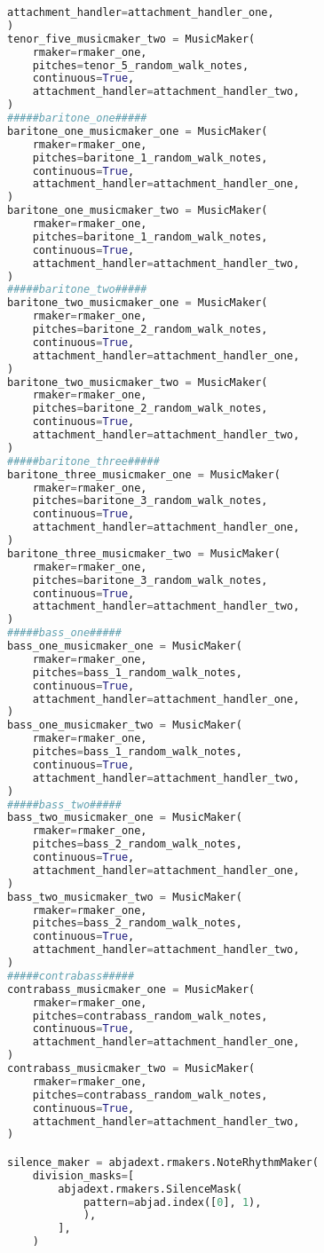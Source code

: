 \begin{lstlisting}[language=Python, caption=Invocation Source Code]
    attachment_handler=attachment_handler_one,
)
tenor_five_musicmaker_two = MusicMaker(
    rmaker=rmaker_one,
    pitches=tenor_5_random_walk_notes,
    continuous=True,
    attachment_handler=attachment_handler_two,
)
#####baritone_one#####
baritone_one_musicmaker_one = MusicMaker(
    rmaker=rmaker_one,
    pitches=baritone_1_random_walk_notes,
    continuous=True,
    attachment_handler=attachment_handler_one,
)
baritone_one_musicmaker_two = MusicMaker(
    rmaker=rmaker_one,
    pitches=baritone_1_random_walk_notes,
    continuous=True,
    attachment_handler=attachment_handler_two,
)
#####baritone_two#####
baritone_two_musicmaker_one = MusicMaker(
    rmaker=rmaker_one,
    pitches=baritone_2_random_walk_notes,
    continuous=True,
    attachment_handler=attachment_handler_one,
)
baritone_two_musicmaker_two = MusicMaker(
    rmaker=rmaker_one,
    pitches=baritone_2_random_walk_notes,
    continuous=True,
    attachment_handler=attachment_handler_two,
)
#####baritone_three#####
baritone_three_musicmaker_one = MusicMaker(
    rmaker=rmaker_one,
    pitches=baritone_3_random_walk_notes,
    continuous=True,
    attachment_handler=attachment_handler_one,
)
baritone_three_musicmaker_two = MusicMaker(
    rmaker=rmaker_one,
    pitches=baritone_3_random_walk_notes,
    continuous=True,
    attachment_handler=attachment_handler_two,
)
#####bass_one#####
bass_one_musicmaker_one = MusicMaker(
    rmaker=rmaker_one,
    pitches=bass_1_random_walk_notes,
    continuous=True,
    attachment_handler=attachment_handler_one,
)
bass_one_musicmaker_two = MusicMaker(
    rmaker=rmaker_one,
    pitches=bass_1_random_walk_notes,
    continuous=True,
    attachment_handler=attachment_handler_two,
)
#####bass_two#####
bass_two_musicmaker_one = MusicMaker(
    rmaker=rmaker_one,
    pitches=bass_2_random_walk_notes,
    continuous=True,
    attachment_handler=attachment_handler_one,
)
bass_two_musicmaker_two = MusicMaker(
    rmaker=rmaker_one,
    pitches=bass_2_random_walk_notes,
    continuous=True,
    attachment_handler=attachment_handler_two,
)
#####contrabass#####
contrabass_musicmaker_one = MusicMaker(
    rmaker=rmaker_one,
    pitches=contrabass_random_walk_notes,
    continuous=True,
    attachment_handler=attachment_handler_one,
)
contrabass_musicmaker_two = MusicMaker(
    rmaker=rmaker_one,
    pitches=contrabass_random_walk_notes,
    continuous=True,
    attachment_handler=attachment_handler_two,
)

silence_maker = abjadext.rmakers.NoteRhythmMaker(
    division_masks=[
        abjadext.rmakers.SilenceMask(
            pattern=abjad.index([0], 1),
            ),
        ],
    )


\end{lstlisting}
